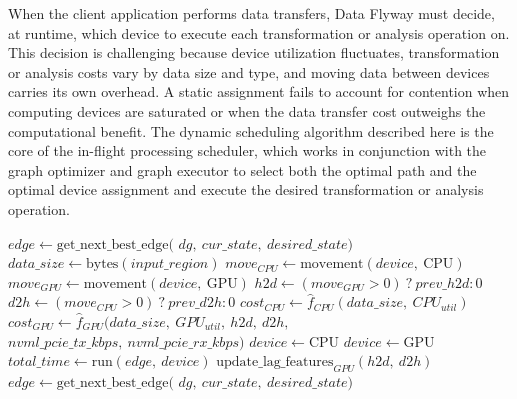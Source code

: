 When the client application performs data transfers, Data Flyway must decide, at runtime, which device to execute each transformation or analysis operation on. This decision is challenging because device utilization fluctuates, transformation or analysis costs vary by data size and type, and moving data between devices carries its own overhead. A static assignment fails to account for contention when computing devices are saturated or when the data transfer cost outweighs the computational benefit. The dynamic scheduling algorithm described here is the core of the in-flight processing scheduler, which works in conjunction with the graph optimizer and graph executor to select both the optimal path and the optimal device assignment and execute the desired transformation or analysis operation.

\begin{algorithm}[t]
\caption{Dynamic scheduling algorithm.}
\label{fig:scheduling_algorithm}
\begin{algorithmic}[1]
\STATE $edge \gets \text{get\_next\_best\_edge}($
\STATE \hspace{2em} $dg,\ cur\_state,\ desired\_state)$
    \STATE $data\_size \gets \text{bytes}(input\_region)$
    \STATE $move_{CPU} \gets \text{movement}(device,\ \text{CPU})$
    \STATE $move_{GPU} \gets \text{movement}(device,\ \text{GPU})$
    \STATE $h2d \gets (move_{GPU} > 0)\ ?\ prev\_h2d : 0$
    \STATE $d2h \gets (move_{CPU} > 0)\ ?\ prev\_d2h : 0$
    \STATE $cost_{CPU} \gets \hat{f}_{CPU}(data\_size,\ CPU_{util})$
    \STATE $cost_{GPU} \gets \hat{f}_{GPU}(data\_size,\ GPU_{util},\ h2d,\ d2h,$
    \STATE \hspace{2em} $nvml\_pcie\_tx\_kbps,\ nvml\_pcie\_rx\_kbps)$
        \STATE $device \gets \text{CPU}$
    \ELSE
        \STATE $device \gets \text{GPU}$
    \ENDIF
    \STATE $total\_time \gets \text{run}(edge,\ device)$
        \STATE $\text{update\_lag\_features}_{GPU}(h2d,\ d2h)$
    \ENDIF
    \STATE $edge \gets \text{get\_next\_best\_edge}($
    \STATE \hspace{2em} $dg,\ cur\_state,\ desired\_state)$
\ENDWHILE
\end{algorithmic}
\end{algorithm}

